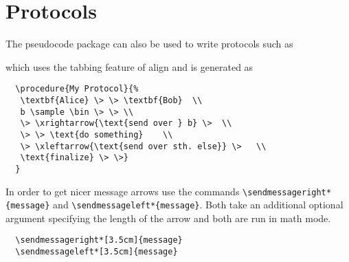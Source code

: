 \documentclass[a4paper]{report}
\begin{document}
  \chapter{Protocols}
  \label{chap:protocols}
  
  The pseudocode package can also be used to write protocols such as
  \begin{center}
  \end{center}
  which uses the tabbing feature of align and is generated as
  \begin{lstlisting}
  \procedure{My Protocol}{%
   \textbf{Alice} \> \> \textbf{Bob}  \\
   b \sample \bin \> \> \\
   \> \xrightarrow{\text{send over } b} \>  \\
   \> \> \text{do something}    \\
   \> \xleftarrow{\text{send over sth. else}} \>   \\
   \text{finalize} \> \>}
  }
  \end{lstlisting}
  
  In order to get nicer message arrows use the commands \lstinline$\sendmessageright*{message}$ and \lstinline$\sendmessageleft*{message}$.
  Both take an additional optional argument specifying the length of the arrow and both are run
  in math mode.
  \begin{lstlisting}
  \sendmessageright*[3.5cm]{message}
  \sendmessageleft*[3.5cm]{message}
  \end{lstlisting}
  
\end{document}
